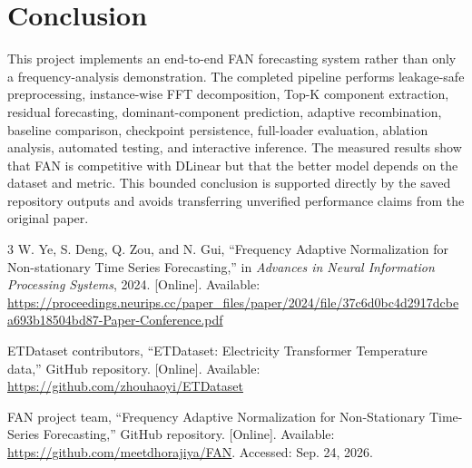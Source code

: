 \documentclass[conference,10pt]{IEEEtran}
\begin{document}
\section{Conclusion}
This project implements an end-to-end FAN forecasting system rather than only a frequency-analysis demonstration. The completed pipeline performs leakage-safe preprocessing, instance-wise FFT decomposition, Top-K component extraction, residual forecasting, dominant-component prediction, adaptive recombination, baseline comparison, checkpoint persistence, full-loader evaluation, ablation analysis, automated testing, and interactive inference. The measured results show that FAN is competitive with DLinear but that the better model depends on the dataset and metric. This bounded conclusion is supported directly by the saved repository outputs and avoids transferring unverified performance claims from the original paper.

\balance
\begin{thebibliography}{3}
W. Ye, S. Deng, Q. Zou, and N. Gui,
``Frequency Adaptive Normalization for Non-stationary Time Series Forecasting,''
in \emph{Advances in Neural Information Processing Systems}, 2024. [Online]. Available:
\url{https://proceedings.neurips.cc/paper_files/paper/2024/file/37c6d0bc4d2917dcbea693b18504bd87-Paper-Conference.pdf}

ETDataset contributors, ``ETDataset: Electricity Transformer Temperature data,'' GitHub repository. [Online]. Available:
\url{https://github.com/zhouhaoyi/ETDataset}

FAN project team, ``Frequency Adaptive Normalization for Non-Stationary Time-Series Forecasting,'' GitHub repository. [Online]. Available:
\url{https://github.com/meetdhorajiya/FAN}. Accessed: Sep. 24, 2026.

\end{thebibliography}
\end{document}
